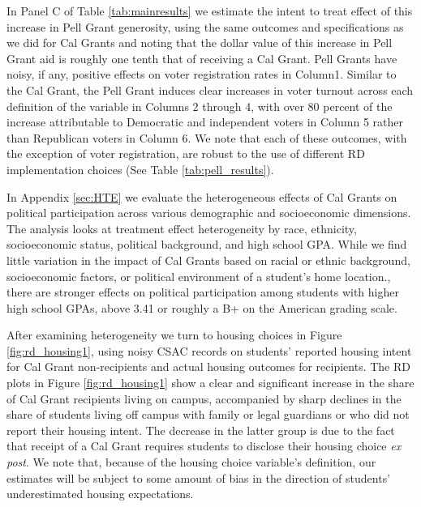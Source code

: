 \documentclass[12pt,letterpaper,oneside]{book}
\begin{document}
In Panel C of Table \ref{tab:mainresults} we estimate the intent to treat effect of this increase in Pell Grant generosity, using the same outcomes and specifications as we did for Cal Grants and noting that the dollar value of this increase in Pell Grant aid is roughly one tenth that of receiving a Cal Grant. Pell Grants have noisy, if any, positive effects on voter registration rates in Column1. Similar to the Cal Grant, the Pell Grant induces clear increases in voter turnout across each definition of the variable in Columns 2 through 4, with over 80 percent of the increase attributable to Democratic and independent voters in Column 5 rather than Republican voters in Column 6. We note that each of these outcomes, with the exception of voter registration, are robust to the use of different RD implementation choices (See Table \ref{tab:pell_results}).

In Appendix \ref{sec:HTE} we evaluate the heterogeneous effects of Cal Grants on political participation across various demographic and socioeconomic dimensions. The analysis looks at treatment effect heterogeneity by race, ethnicity, socioeconomic status, political background, and high school GPA. While we find little variation in the impact of Cal Grants based on racial or ethnic background, socioeconomic factors, or political environment of a student's home location., there are stronger effects on political participation among students with higher high school GPAs, above 3.41 or roughly a B+ on the American grading scale.

After examining heterogeneity we turn to housing choices in Figure \ref{fig:rd_housing1}, using noisy CSAC records on students' reported housing intent for Cal Grant non-recipients and actual housing outcomes for recipients. The RD plots in Figure \ref{fig:rd_housing1} show a clear and significant increase in the share of Cal Grant recipients living on campus, accompanied by sharp declines in the share of students living off campus with family or legal guardians or who did not report their housing intent. The decrease in the latter group is due to the fact that receipt of a Cal Grant requires students to disclose their housing choice \textit{ex post}. We note that, because of the housing choice variable's definition, our estimates will be subject to some amount of bias in the direction of students' underestimated housing expectations.
\end{document}
